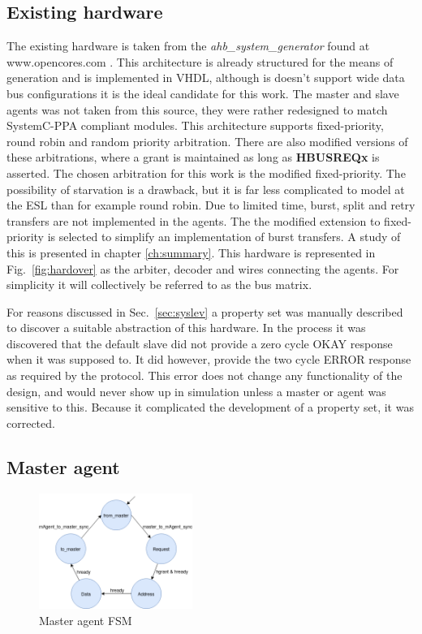\subsection{Existing hardware}
\label{sub:exist}
The existing hardware is taken from the \textit{ahb\_system\_generator} found at www.opencores.com \cite{ahbsys}. This architecture is already structured for the
means of generation and is implemented in VHDL, although is doesn't support wide data bus configurations it is the ideal candidate for this work. The master and slave agents was not taken from this source, they were rather redesigned to match SystemC-PPA compliant modules. This architecture supports fixed-priority, round robin and random priority arbitration. There are also modified versions of these arbitrations, where a grant is maintained as long as \textbf{HBUSREQx} is asserted. The chosen arbitration for this work is the modified fixed-priority. The possibility of starvation is a drawback, but it is far less complicated to model at the ESL than for example round robin. Due to limited time, burst, split and retry transfers are not implemented in the agents. The the modified extension to fixed-priority is selected to simplify an implementation of burst transfers. A study of this is presented in chapter \ref{ch:summary}. This hardware is represented in Fig.~\ref{fig:hardover} as the arbiter, decoder and wires connecting the agents. For simplicity it will collectively be referred to as the bus matrix. \par 
For reasons discussed in Sec.~\ref{sec:syslev} a property set was manually described to discover a suitable abstraction of this hardware. In the process it was
discovered that the default slave did not provide a zero cycle OKAY response when it was supposed to. It did however, provide the two cycle ERROR response as 
required by the protocol. This error does not change any functionality of the design, and would never show up in simulation unless a master or agent was sensitive to this. Because it complicated the development of a property set, it was corrected. 

   
\subsection{Master agent}
\begin{figure}
\includegraphics[width=5cm]{figs/hw/mAgent_FSM.png}
\caption{Master agent FSM}\label{fig:rafsm}
\end{figure}  

